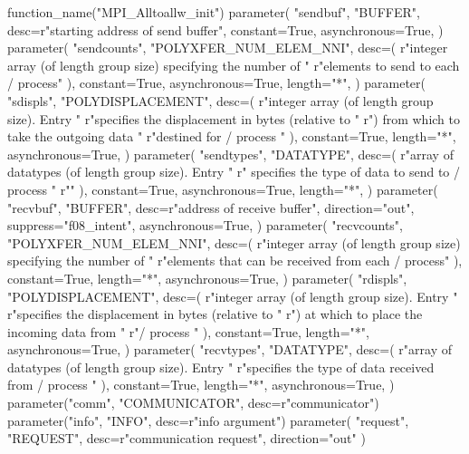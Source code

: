 \begin{mpi-binding}
    function_name("MPI_Alltoallw_init")
    parameter(
        "sendbuf",
        "BUFFER",
        desc=r"starting address of send buffer",
        constant=True,
        asynchronous=True,
    )
    parameter(
        "sendcounts",
        "POLYXFER_NUM_ELEM_NNI",
        desc=(
            r"integer array (of length group size) specifying the number of "
            r"elements to send to each \MPI/ process"
        ),
        constant=True,
        asynchronous=True,
        length="*",
    )
    parameter(
        "sdispls",
        "POLYDISPLACEMENT",
        desc=(
            r"integer array (of length group size). Entry  "
            r"specifies the displacement in bytes (relative to "
            r") from which to take the outgoing data "
            r"destined for \MPI/ process "
        ),
        constant=True,
        length="*",
        asynchronous=True,
    )
    parameter(
        "sendtypes",
        "DATATYPE",
        desc=(
            r"array of datatypes (of length group size). Entry "
            r" specifies the type of data to send to \MPI/ process "
            r""
        ),
        constant=True,
        asynchronous=True,
        length="*",
    )
    parameter(
        "recvbuf",
        "BUFFER",
        desc=r"address of receive buffer",
        direction="out",
        suppress="f08_intent",
        asynchronous=True,
    )
    parameter(
        "recvcounts",
        "POLYXFER_NUM_ELEM_NNI",
        desc=(
            r"integer array (of length group size) specifying the number of "
            r"elements that can be received from each \MPI/ process"
        ),
        constant=True,
        length="*",
        asynchronous=True,
    )
    parameter(
        "rdispls",
        "POLYDISPLACEMENT",
        desc=(
            r"integer array (of length group size). Entry  "
            r"specifies the displacement in bytes (relative to "
            r") at which to place the incoming data from "
            r"\MPI/ process "
        ),
        constant=True,
        length="*",
        asynchronous=True,
    )
    parameter(
        "recvtypes",
        "DATATYPE",
        desc=(
            r"array of datatypes (of length group size). Entry  "
            r"specifies the type of data received from \MPI/ process "
        ),
        constant=True,
        length="*",
        asynchronous=True,
    )
    parameter("comm", "COMMUNICATOR", desc=r"communicator")
    parameter("info", "INFO", desc=r"info argument")
    parameter(
        "request", "REQUEST", desc=r"communication request", direction="out"
    )
\end{mpi-binding}

